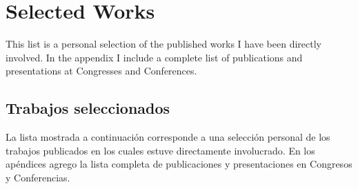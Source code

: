 \ifeng
\section*{Selected Works}
\noindent

This list is a personal selection of the published works I have been directly involved. In the appendix I include a complete list of publications and presentations at Congresses and Conferences.

\else
\subsection*{Trabajos seleccionados}
\noindent

La lista mostrada a continuación corresponde a una selección personal de los trabajos publicados en los cuales estuve directamente involucrado. En los apéndices agrego la lista completa de publicaciones y presentaciones en Congresos y Conferencias.
\fi

